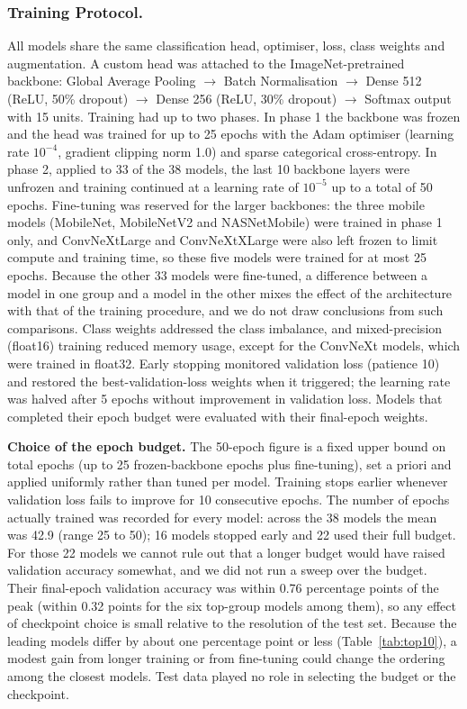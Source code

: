 \subsubsection{Training Protocol.}

\label{sec:training}
All models share the same classification head, optimiser, loss, class
weights and augmentation. A custom head was attached to the
ImageNet-pretrained backbone: Global Average Pooling $\to$ Batch
Normalisation $\to$ Dense 512 (ReLU, 50\% dropout) $\to$ Dense 256 (ReLU,
30\% dropout) $\to$ Softmax output with 15 units. Training had up to two
phases. In phase 1 the backbone was frozen and the head was trained for up
to 25 epochs with the Adam optimiser (learning rate $10^{-4}$, gradient
clipping norm 1.0) and sparse categorical cross-entropy. In phase 2,
applied to 33 of the 38 models, the last 10 backbone layers were unfrozen
and training continued at a learning rate of $10^{-5}$ up to a total of 50
epochs. Fine-tuning was reserved for the larger backbones: the three mobile
models (MobileNet, MobileNetV2 and NASNetMobile) were trained in phase 1
only, and ConvNeXtLarge and ConvNeXtXLarge were also left frozen to limit
compute and training time, so these five models were trained for at most
25 epochs. Because the other 33 models were fine-tuned, a difference
between a model in one group and a model in the other mixes the effect of
the architecture with that of the training procedure, and we do not draw
conclusions from such comparisons. Class weights addressed the class
imbalance, and mixed-precision (float16) training reduced memory usage,
except for the ConvNeXt models, which were trained in float32.
Early stopping monitored validation loss (patience 10) and restored
the best-validation-loss weights when it triggered; the learning rate was
halved after 5 epochs without improvement in validation loss. Models that
completed their epoch budget were evaluated with their final-epoch weights.

\textbf{Choice of the epoch budget.} The 50-epoch figure is a fixed upper
bound on total epochs (up to 25 frozen-backbone epochs plus fine-tuning),
set a priori and applied uniformly rather than tuned per model. Training
stops earlier whenever validation loss fails to improve for 10 consecutive
epochs. The number of epochs actually trained was recorded for every model:
across the 38 models the mean was 42.9 (range 25 to 50); 16 models stopped
early and 22 used their full budget. For those 22 models we cannot rule out
that a longer budget would have raised validation accuracy somewhat, and we
did not run a sweep over the budget. Their final-epoch validation accuracy
was within 0.76 percentage points of the peak (within 0.32 points for the
six top-group models among them), so any effect of checkpoint choice is
small relative to the resolution of the test set. Because the leading models
differ by about one percentage point or less (Table~\ref{tab:top10}), a
modest gain from longer training or from fine-tuning could change the
ordering among the closest models. Test data played no role in selecting the
budget or the checkpoint.

